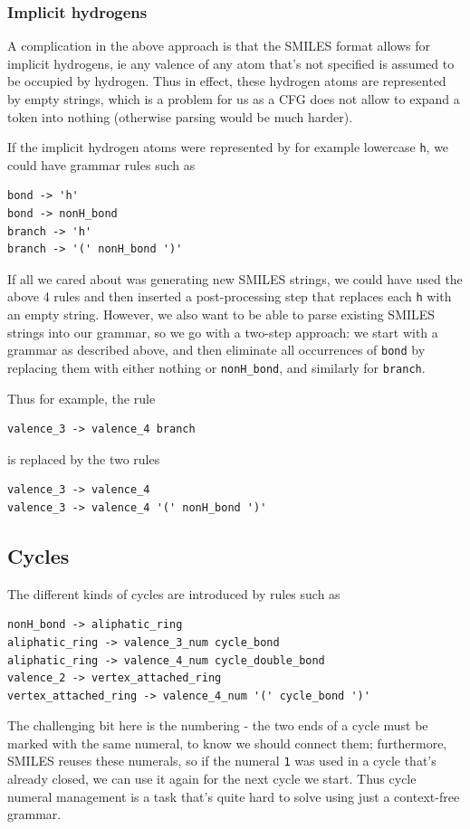 \documentclass[11pt]{article}
\begin{document}
\subsubsection{Implicit hydrogens}\label{sec:hydrogen}
A complication in the above approach is that the SMILES format allows for implicit hydrogens, ie any valence of any atom that's not specified is assumed to be occupied by hydrogen. Thus in effect, these hydrogen atoms are represented by empty strings, which is a problem for us as a CFG does not allow to expand a token into nothing (otherwise parsing would be much harder).

If the implicit hydrogen atoms were represented by for example lowercase \verb|h|, we could have grammar rules such as 
\begin{verbatim}
bond -> 'h'
bond -> nonH_bond
branch -> 'h'
branch -> '(' nonH_bond ')'
\end{verbatim}
If all we cared about was generating new SMILES strings, we could have used the above 4 rules and then inserted a post-processing step that replaces each \verb|h| with an empty string. However, we also want to be able to parse existing SMILES strings into our grammar, so we go with a two-step approach: we start with a grammar as described above, and then eliminate all occurrences of \verb|bond| by replacing them with either nothing or \verb|nonH_bond|, and similarly for \verb|branch|.

Thus for example, the rule
\begin{verbatim}
valence_3 -> valence_4 branch
\end{verbatim} is replaced by the two rules
\begin{verbatim}
valence_3 -> valence_4
valence_3 -> valence_4 '(' nonH_bond ')'
\end{verbatim}
\subsection{Cycles}
The different kinds of cycles are introduced by rules such as 
\begin{verbatim}
nonH_bond -> aliphatic_ring
aliphatic_ring -> valence_3_num cycle_bond
aliphatic_ring -> valence_4_num cycle_double_bond
valence_2 -> vertex_attached_ring
vertex_attached_ring -> valence_4_num '(' cycle_bond ')'
\end{verbatim}
The challenging bit here is the numbering - the two ends of a cycle must be marked with the same numeral, to know we should connect them; furthermore, SMILES reuses these numerals, so if the numeral \verb|1| was used in a cycle that's already closed, we can use it again for the next cycle we start. Thus cycle numeral management is a task that's quite hard to solve using just a context-free grammar.
\end{document}
